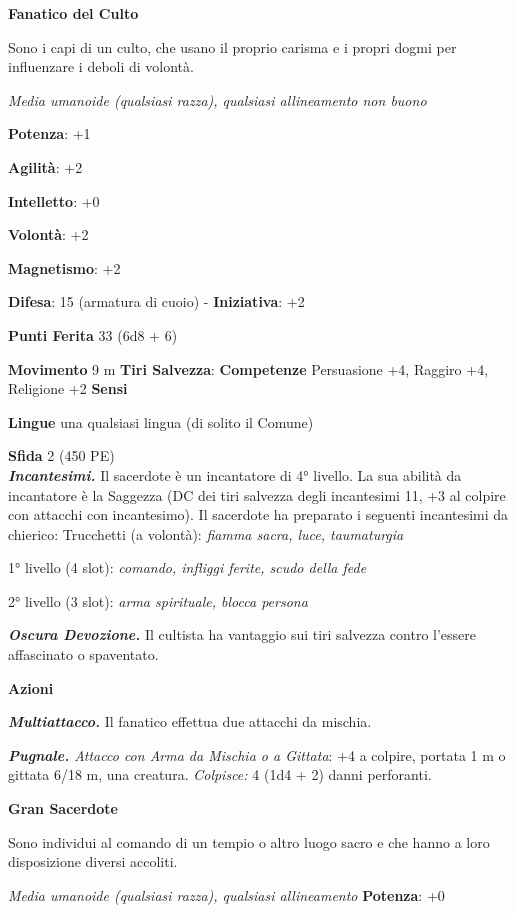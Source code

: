 \begin{multicols}{2}
\textbf{Fanatico del Culto}

Sono i capi di un culto, che usano il proprio carisma e i propri dogmi
per influenzare i deboli di volontà.

\emph{Media umanoide (qualsiasi razza), qualsiasi allineamento non
buono}

\textbf{Potenza}: +1

\textbf{Agilità}: +2

\textbf{Intelletto}: +0

\textbf{Volontà}: +2

\textbf{Magnetismo}: +2

\textbf{Difesa}: 15 (armatura di cuoio) - \textbf{Iniziativa}: +2

\textbf{Punti Ferita} 33 (6d8 + 6)

\textbf{Movimento} 9 m
\textbf{Tiri Salvezza}:
\textbf{Competenze} Persuasione +4, Raggiro +4, Religione +2 \textbf{Sensi}


\textbf{Lingue} una qualsiasi lingua (di solito il Comune)

\textbf{Sfida} 2 (450 PE)\smallskip\\

\emph{\textbf{Incantesimi.}} Il sacerdote è un incantatore di 4°
livello. La sua abilità da incantatore è la Saggezza (DC dei tiri
salvezza degli incantesimi 11, +3 al colpire con attacchi con
incantesimo). Il sacerdote ha preparato i seguenti incantesimi da
chierico: Trucchetti (a volontà): \emph{fiamma sacra, luce, taumaturgia}

1° livello (4 slot): \emph{comando, infliggi ferite, scudo della fede}

2° livello (3 slot): \emph{arma spirituale, blocca persona}

\emph{\textbf{Oscura Devozione.}} Il cultista ha vantaggio sui tiri
salvezza contro l'essere affascinato o spaventato.

\smallskip\textbf{Azioni}

\emph{\textbf{Multiattacco.}} Il fanatico effettua due attacchi da
mischia.

\emph{\textbf{Pugnale.} Attacco con Arma da Mischia o a Gittata}: +4 a
colpire, portata 1 m o gittata 6/18 m, una creatura. \emph{Colpisce:}
4 (1d4 + 2) danni perforanti.

\textbf{Gran Sacerdote}

Sono individui al comando di un tempio o altro luogo sacro e che hanno a
loro disposizione diversi accoliti.

\emph{Media umanoide (qualsiasi razza), qualsiasi allineamento}
\textbf{Potenza}: +0


\end{multicols}
